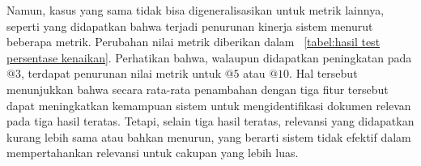 Namun, kasus yang sama tidak bisa digeneralisasikan untuk metrik lainnya, seperti yang didapatkan bahwa terjadi penurunan kinerja sistem menurut beberapa metrik. Perubahan nilai metrik diberikan dalam \tabel{}~\ref{tabel:hasil test persentase kenaikan}. Perhatikan bahwa, walaupun didapatkan peningkatan pada \recall{}$@3$, terdapat penurunan nilai metrik untuk \recall{}$@5$ atau \recall{}$@10$. Hal tersebut menunjukkan bahwa secara rata-rata penambahan \reranker{} dengan tiga fitur tersebut dapat meningkatkan kemampuan sistem untuk mengidentifikasi dokumen relevan pada tiga hasil teratas. Tetapi, selain tiga hasil teratas, relevansi yang didapatkan kurang lebih sama atau bahkan menurun, yang berarti sistem tidak efektif dalam mempertahankan relevansi untuk cakupan yang lebih luas.

\begin{table}[H]
    \centering
    \caption{Persentase perubahan metrik pada data \testing{}}
    \label{tabel:hasil test persentase kenaikan}
\end{table}

